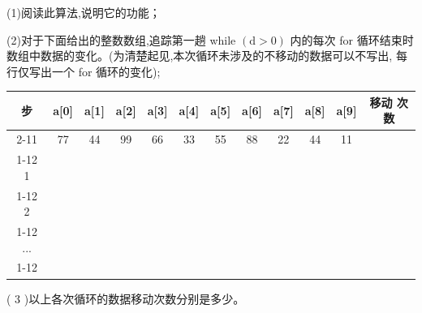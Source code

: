 (1)阅读此算法,说明它的功能；

(2)对于下面给出的整数数组,追踪第一趟 while \(\left( {\mathrm{d} > 0}\right)\) 内的每次 for 循环结束时数组中数据的变化。(为清楚起见,本次循环未涉及的不移动的数据可以不写出, 每行仅写出一个 for 循环的变化);

\begin{center}
\begin{tabular}{|c|c|c|c|c|c|c|c|c|c|c|c|}
\hline
\multirow{2}{*}{步} & a[0] & a[1] & a[2] & a[3] & a[4] & a[5] & a[6] & a[7] & a[8] & a[9] & \multirow{2}{*}{移动 次数} \\
\cline{2-11}
 & 77 & 44 & 99 & 66 & 33 & 55 & 88 & 22 & 44 & 11 &  \\
\cline{1-12}
1 & \phantom{X} & \phantom{X} & \phantom{X} & \phantom{X} & \phantom{X} & \phantom{X} & \phantom{X} & \phantom{X} & \phantom{X} & \phantom{X} & \phantom{X} \\
\cline{1-12}
2 & \phantom{X} & \phantom{X} & \phantom{X} & \phantom{X} & \phantom{X} & \phantom{X} & \phantom{X} & \phantom{X} & \phantom{X} & \phantom{X} & \phantom{X} \\
\cline{1-12}
... & \phantom{X} & \phantom{X} & \phantom{X} & \phantom{X} & \phantom{X} & \phantom{X} & \phantom{X} & \phantom{X} & \phantom{X} & \phantom{X} & \phantom{X} \\
\cline{1-12}
\hline
\end{tabular}
\end{center}

( 3 )以上各次循环的数据移动次数分别是多少。

